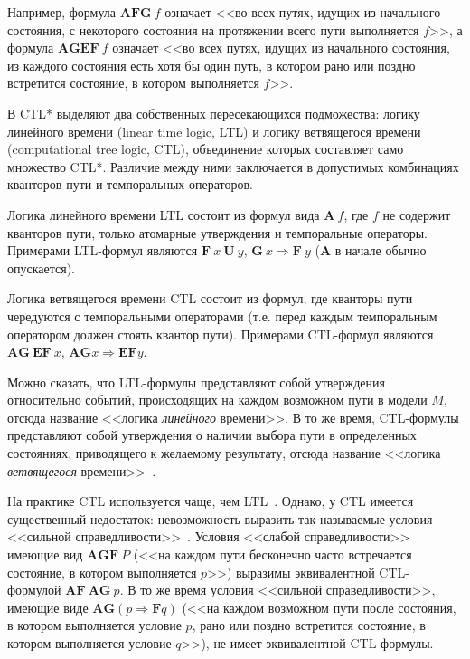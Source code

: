 \documentclass[a4paper,notitlepage,14pt]{article}
\begin{document}
Например, формула $\mathbf{AFG}~ f$ означает <<во всех путях, идущих из начального
состояния, с некоторого состояния на протяжении всего пути выполняется $f$>>, а формула
$\mathbf{AGEF}~ f$ означает <<во всех путях, идущих из начального состояния, из каждого
состояния есть хотя бы один путь, в котором рано или поздно встретится состояние, в
котором выполняется $f$>>.

В CTL* выделяют два собственных пересекающихся подможества: логику линейного времени
(linear time logic, LTL) и логику ветвящегося времени (computational tree logic, CTL),
объединение которых составляет само множество CTL*. Различие между ними заключается в
допустимых комбинациях кванторов пути и темпоральных операторов.

Логика линейного времени LTL состоит из формул вида $\mathbf{A}~f$, где $f$ не содержит
кванторов пути, только атомарные утверждения и темпоральные операторы. Примерами
LTL-формул являются $\mathbf{F}~x~\mathbf{U}~y$, $\mathbf{G}~x \Rightarrow \mathbf{F}~y$
($\mathbf{A}$ в начале обычно опускается).

Логика ветвящегося времени CTL состоит из формул, где кванторы пути чередуются с
темпоральными операторами (т.е. перед каждым темпоральным оператором должен стоять квантор
пути). Примерами CTL-формул являются $\mathbf{AG}~\mathbf{EF}~x$, $\mathbf{AG} x
\Rightarrow \mathbf{EF} y$.

Можно сказать, что LTL-формулы представляют собой утверждения относительно событий,
происходящих на каждом возможном пути в модели $M$, отсюда название <<логика
\emph{линейного} времени>>. В то же время, CTL-формулы представляют собой утверждения о
наличии выбора пути в определенных состояниях, приводящего к желаемому результату, отсюда
название <<логика \emph{ветвящегося} времени>>~\cite{Clarke}.

На практике CTL используется чаще, чем LTL~\cite{Stirling96modaland}. Однако, у CTL
имеется существенный недостаток: невозможность выразить так называемые условия <<сильной
справедливости>>~\cite{Katoen,DBLP:conf/spin/FaragoS09}. Условия <<слабой справедливости>>
имеющие вид $\mathbf{AGF}~P$ (<<на каждом пути бесконечно часто встречается состояние, в
котором выполняется $p$>>) выразимы эквивалентной CTL-формулой $\mathbf{AF~AG}~p$. В то же
время условия <<сильной справедливости>>, имеющие виде $\mathbf{AG} (p \Rightarrow
\mathbf{F} q)$ (<<на каждом возможном пути после состояния, в котором выполняется условие
$p$, рано или поздно встретится состояние, в котором выполняется условие $q$>>), не имеет
эквивалентной CTL-формулы.
\end{document}
